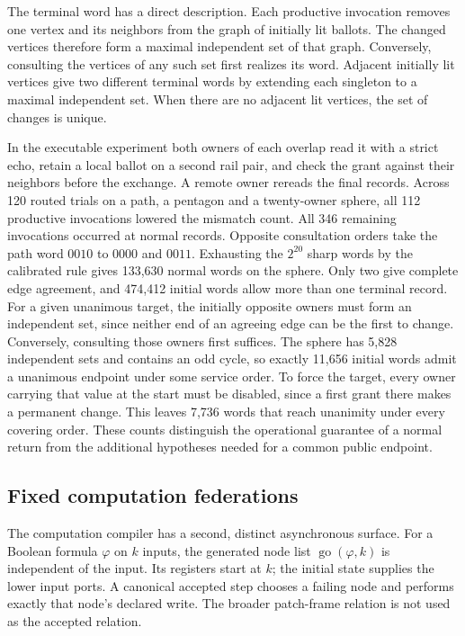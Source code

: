 \documentclass[11pt]{article}
\theoremstyle{definition}
\theoremstyle{remark}
\numberwithin{equation}{section}
\begin{document}
The terminal word has a direct description. Each productive invocation
removes one vertex and its neighbors from the graph of initially lit ballots.
The changed vertices therefore form a maximal independent set of that graph.
Conversely, consulting the vertices of any such set first realizes its word.
Adjacent initially lit vertices give two different terminal words by extending
each singleton to a maximal independent set. When there are no adjacent lit
vertices, the set of changes is unique.

In the executable experiment both owners of each overlap read it with a
strict echo, retain a local ballot on a second rail pair, and check the grant
against their neighbors before the exchange. A remote owner rereads the
final records. Across 120 routed trials on a path, a pentagon and a
twenty-owner sphere, all 112 productive invocations lowered the mismatch
count. All 346 remaining invocations occurred at normal records. Opposite
consultation orders take the path word $0010$ to $0000$ and $0011$.
Exhausting the $2^{20}$ sharp words by the calibrated rule gives 133,630
normal words on the sphere. Only two give complete edge agreement, and
474,412 initial words allow more than one terminal record. For a given
unanimous target, the initially opposite owners must form an independent
set, since neither end of an agreeing edge can be the first to change.
Conversely, consulting those owners first suffices. The sphere has 5,828
independent sets and contains an odd cycle, so exactly 11,656 initial
words admit a unanimous endpoint under some service order. To force the
target, every owner carrying that value at the start must be
disabled, since a first grant there makes a permanent change. This
leaves 7,736 words that reach unanimity under every covering order. These counts
distinguish the operational guarantee of a normal return from the additional
hypotheses needed for a common public endpoint.

\subsection{Fixed computation federations}

The computation compiler has a second, distinct asynchronous surface.  For a
Boolean formula \(\varphi\) on \(k\) inputs, the generated node list
\(\operatorname{go}(\varphi,k)\) is independent of the input.  Its registers
start at \(k\); the initial state supplies the lower input ports.  A canonical
accepted step chooses a failing node and performs exactly that node's declared
write.  The broader patch-frame relation is not used as the accepted
relation.
\end{document}
